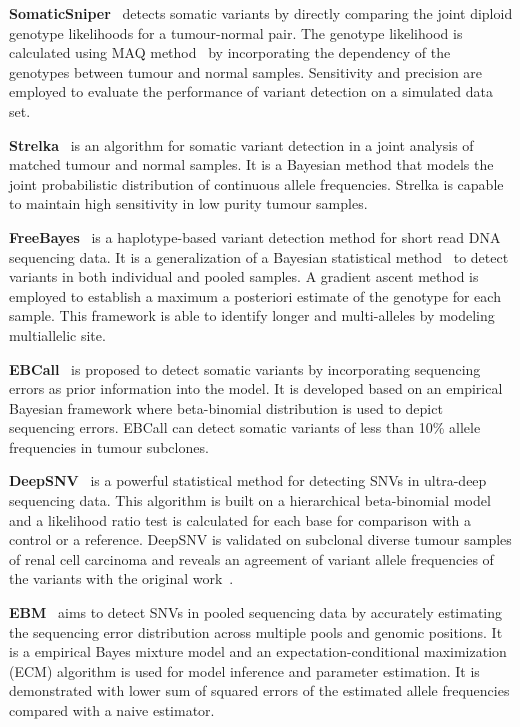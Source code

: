 \documentclass[a4,center,fleqn]{NAR}
\begin{document}
\textbf{SomaticSniper}~\citep{Larson2012} detects somatic variants by directly comparing the joint diploid genotype likelihoods for a tumour-normal pair.
The genotype likelihood is calculated using MAQ method~\citep{Li2008} by incorporating the dependency of the genotypes between tumour and normal samples.
Sensitivity and precision are employed to evaluate the performance of variant detection on a simulated data set.

\textbf{Strelka}~\citep{Saunders2012} is an algorithm for somatic variant detection in a joint analysis of matched tumour and normal samples.
It is a Bayesian method that models the joint probabilistic distribution of continuous allele frequencies.
Strelka is capable to maintain high sensitivity in low purity tumour samples.

\textbf{FreeBayes}~\citep{Garrison2012} is a haplotype-based variant detection method for short read DNA sequencing data.
It is a generalization of a Bayesian statistical method~\citep{marth1999general} to detect variants in both individual and pooled samples.
A gradient ascent method is employed to establish a maximum a posteriori estimate of the genotype for each sample.
This framework is able to identify longer and multi-alleles by modeling multiallelic site.

\textbf{EBCall}~\citep{Shiraishi2013} is proposed to detect somatic variants by incorporating sequencing errors as prior information into the model.
It is developed based on an empirical Bayesian framework where beta-binomial distribution is used to depict sequencing errors.
EBCall can detect somatic variants of less than 10\% allele frequencies in tumour subclones.

\textbf{DeepSNV}~\citep{gerstung2012reliable} is a powerful statistical method for detecting SNVs in ultra-deep sequencing data.
This algorithm is built on a hierarchical beta-binomial model and a likelihood ratio test is calculated for each base for comparison with a control or a reference.
DeepSNV is validated on subclonal diverse tumour samples of renal cell carcinoma and reveals an agreement of variant allele frequencies of the variants with the original work~\citep{gerstung2012reliable}.

\textbf{EBM}~\citep{Zhou2012} aims to detect SNVs in pooled sequencing data by accurately estimating the sequencing error distribution across multiple pools and genomic positions. 
It is a empirical Bayes mixture model and an expectation-conditional maximization (ECM) algorithm is used for model inference and parameter estimation.
It is demonstrated with lower sum of squared errors of the estimated allele frequencies compared with a naive estimator.
\end{document}
